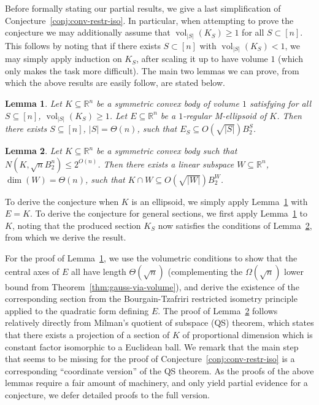 \documentclass[12pt]{article}
\newtheorem{lemma}{Lemma}
\newcommand{\R}{{\mathbb{R}}}
\DeclareMathOperator{\vol}{vol}
\begin{document}
Before formally stating our partial results, we give a last simplification of
Conjecture~\ref{conj:conv-restr-iso}. In particular, when attempting to prove
the conjecture we may additionally assume that $\vol_{|S|}(K_S) \geq 1$ for all
$S \subset [n]$. This follows by noting that if there exists $S \subset [n]$
with $\vol_{|S|}(K_S) < 1$, we may simply apply induction on $K_S$, after
scaling it up to have volume $1$ (which only makes the task more difficult). The
main two lemmas we can prove, from which the above results are easily follow,
are stated below. 

\begin{lemma}
\label{lem:axis-m-ell}
Let $K \subseteq \R^n$ be a symmetric convex body of volume $1$ satisfying
for all $S \subseteq [n]$, $\vol_{|S|}(K_S) \geq 1$. Let $E \subseteq \R^n$ be a
$1$-regular M-ellipsoid of $K$. Then there exists $S \subseteq [n]$, $|S| =
\Theta(n)$, such that $E_S \subseteq O(\sqrt{|S|}) B_2^S$.
\end{lemma}

\begin{lemma}
\label{lem:cover-to-section}
Let $K \subseteq \R^n$ be a symmetric convex body such that $N(K,\sqrt{n}B_2^n)
\leq 2^{O(n)}$. Then there exists a linear subspace $W \subseteq \R^n$, $\dim(W) =
\Theta(n)$, such that $K \cap W \subseteq O(\sqrt{|W|}) B_2^W$.  
\end{lemma}

To derive the conjecture when $K$ is an ellipsoid, we simply apply
Lemma~\ref{lem:axis-m-ell} with $E=K$. To derive the conjecture for general
sections, we first apply Lemma~\ref{lem:axis-m-ell} to $K$, noting that the
produced section $K_S$ now satisfies the conditions of
Lemma~\ref{lem:cover-to-section}, from which we derive the result.  

For the proof of Lemma~\ref{lem:axis-m-ell}, we use the volumetric conditions to
show that the central axes of $E$ all have length $\Theta(\sqrt{n})$
(complementing the $\Omega(\sqrt{n})$ lower bound from
Theorem~\ref{thm:gauss-via-volume}), and derive the existence of the
corresponding section from the Bourgain-Tzafriri restricted isometry principle
applied to the quadratic form defining $E$. The proof of
Lemma~\ref{lem:cover-to-section} follows relatively directly from Milman's
quotient of subspace (QS) theorem, which states that there exists a projection
of a section of $K$ of proportional dimension which is constant factor
isomorphic to a Euclidean ball. We remark that the main step that seems to be
missing for the proof of Conjecture~\ref{conj:conv-restr-iso} is a
corresponding ``coordinate version'' of the QS theorem. As the proofs of the
above lemmas require a fair amount of machinery, and only yield partial evidence
for a conjecture, we defer detailed proofs to the full version.  
\end{document}
